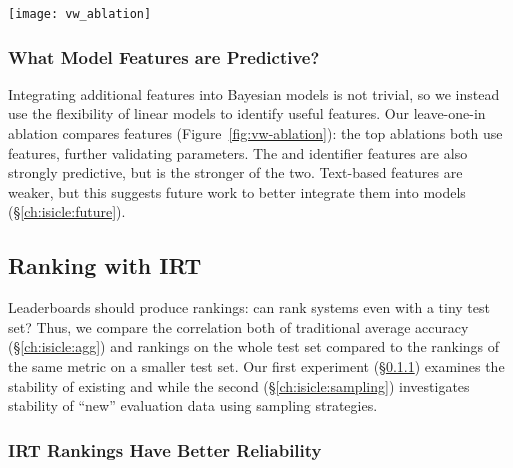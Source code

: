 \begin{figure*}[th]
    \centering
    \texttt{[image: vw\_ablation]}
    \caption{
        We compare each \irt{} and linear model () by how well they predict \subj{} \resps{}.
        We focus on  since predicting responses is an imbalanced classification problem (most \subjs{} are correct).
        Under that metric, all \irt{} models improve over the best
        , and the strongest  ablation only uses \irt{} features.
        That textual features are predictive in the  suggests they could improve future models.
    }
    \label{fig:vw-ablation}
\end{figure*}


\subsubsection{What Model Features are Predictive?}

Integrating additional features into Bayesian models is not trivial,
so we instead use the flexibility of linear models to identify useful
features.
%
Our leave-one-in ablation compares features (Figure~\ref{fig:vw-ablation}):
the top ablations both use \irt{} features, further validating
\irt{} parameters.
%
The \subj{} and \itm{} identifier features are also
strongly predictive, but \itm{} is the stronger of the two.
%
Text-based features are weaker, but this suggests future work to
better integrate them into \irt{} models (\S\ref{ch:isicle:future}).



\subsection{Ranking with IRT}

Leaderboards should produce  \subj{} rankings: can
\name{} rank systems even with a tiny test set?
%
Thus, we compare the correlation both of traditional average accuracy
(\S\ref{ch:isicle:agg}) and \irt{} rankings on the whole test
set compared to the rankings of the same metric on a smaller test set.
%
Our first experiment (\S\ref{ch:isicle:stable}) examines the stability
of existing \itms{} and \subjs{} while the second
(\S\ref{ch:isicle:sampling}) investigates stability of ``new''
evaluation data using sampling strategies.

\subsubsection{IRT Rankings Have Better Reliability}
\label{ch:isicle:stable}


